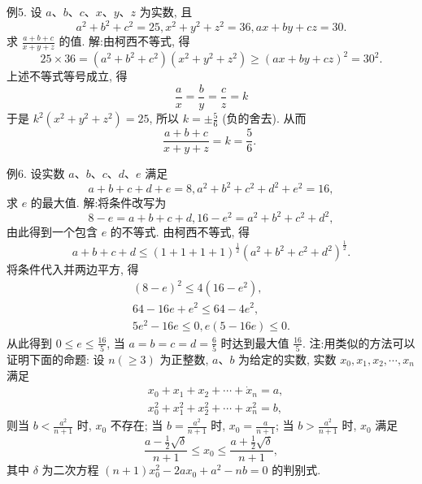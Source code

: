例5. 设 $a 、 b 、 c 、 x 、 y 、 z$ 为实数, 且
$$
a^2+b^2+c^2=25, x^2+y^2+z^2=36, a x+b y+c z=30 .
$$
求 $\frac{a+b+c}{x+y+z}$ 的值.
解:由柯西不等式, 得
$$
25 \times 36=\left(a^2+b^2+c^2\right)\left(x^2+y^2+z^2\right) \geqslant(a x+b y+c z)^2=30^2 .
$$
上述不等式等号成立, 得
$$
\frac{a}{x}=\frac{b}{y}=\frac{c}{z}=k
$$
于是 $k^2\left(x^2+y^2+z^2\right)=25$, 所以 $k= \pm \frac{5}{6}$ (负的舍去). 从而
$$
\frac{a+b+c}{x+y+z}=k=\frac{5}{6} \text {. }
$$



例6. 设实数 $a 、 b 、 c 、 d 、 e$ 满足
$$
a+b+c+d+e=8, a^2+b^2+c^2+d^2+e^2=16,
$$
求 $e$ 的最大值.
解:将条件改写为
$$
8-e=a+b+c+d, 16-e^2=a^2+b^2+c^2+d^2,
$$
由此得到一个包含 $e$ 的不等式.
由柯西不等式, 得
$$
a+b+c+d \leqslant(1+1+1+1)^{\frac{1}{2}}\left(a^2+b^2+c^2+d^2\right)^{\frac{1}{2}} .
$$
将条件代入并两边平方, 得
$$
\begin{gathered}
(8-e)^2 \leqslant 4\left(16-e^2\right), \\
64-16 e+e^2 \leqslant 64-4 e^2, \\
5 e^2-16 e \leqslant 0, e(5-16 e) \leqslant 0 .
\end{gathered}
$$
从此得到 $0 \leqslant e \leqslant \frac{16}{5}$, 当 $a=b=c=d=\frac{6}{5}$ 时达到最大值 $\frac{16}{5}$.
注:用类似的方法可以证明下面的命题:
设 $n(\geqslant 3)$ 为正整数, $a 、 b$ 为给定的实数, 实数 $x_0, x_1, x_2, \cdots, x_n$ 满足
$$
\begin{aligned}
& x_0+x_1+x_2+\cdots+\dot{x}_n=a, \\
& x_0^2+x_1^2+x_2^2+\cdots+x_n^2=b,
\end{aligned}
$$
则当 $b<\frac{a^2}{n+1}$ 时, $x_0$ 不存在;
当 $b=\frac{a^2}{n+1}$ 时, $x_0=\frac{a}{n+1}$;
当 $b>\frac{a^2}{n+1}$ 时, $x_0$ 满足
$$
\frac{a-\frac{1}{2} \sqrt{\delta}}{n+1} \leqslant x_0 \leqslant \frac{a+\frac{1}{2} \sqrt{\delta}}{n+1},
$$
其中 $\delta$ 为二次方程 $(n+1) x_0^2-2 a x_0+a^2-n b=0$ 的判别式.




